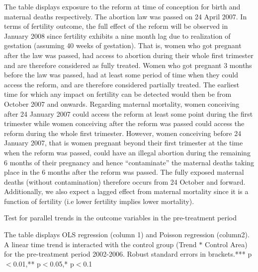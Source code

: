 \documentclass[a4paper, 11pt]{article}
\begin{document}
\begin{spacing}{1.4}
\begin{table}
\begin{threeparttable}
\begin{tablenotes}
  			The table displays exposure to the reform at time of conception for birth and maternal deaths respectively. The abortion law was passed on 24 April 2007. In terms of fertility outcome, the full effect of the reform will be observed in January 2008 since fertility exhibits a nine month lag due to realization of gestation (assuming 40 weeks of gestation). That is, women who got pregnant after the law was passed, had access to abortion during their whole first trimester and are therefore considered as fully treated. Women who got pregnant 3 months before the law was passed, had at least some period of time when they could access the reform, and are therefore considered partially treated. The earliest time for which any impact on fertility can be detected would then be from October 2007 and onwards. Regarding maternal mortality, women conceiving after 24 January 2007 could access the reform at least some point during the first trimester while women conceiving after the reform was passed could access the reform during the whole first trimester. However, women conceiving before 24 January 2007, that is women pregnant beyond their first trimester at the time when the reform was passed, could have an illegal abortion during the remaining 6 months of their pregnancy and hence ``contaminate'' the maternal deaths taking place in the 6 months after the reform was passed. The fully exposed maternal deaths (without contamination) therefore occurs from 24 October and forward. Additionally, we also expect a lagged effect from maternal mortality since it is a function of fertility (i.e lower fertility implies lower mortality).  
  			
  			           

  		\end{tablenotes}

  \end{threeparttable} 	

\end{table}  
 

\begin{table}[H]\caption{Test for parallel trends in the outcome variables in the pre-treatment period}\label{trendreg}  
	\begin{threeparttable}	
	
{\footnotesize 	\begin{tablenotes}
	\item The table displays OLS regression (column 1) and Poisson regression (column2). A linear time trend is interacted with the control group (Trend $*$ Control Area) for the pre-treatment period 2002-2006. Robust standard errors in brackets.*** p$<$0.01,** p$<$0.05,* p$<$0.1
\end{tablenotes}}
\end{threeparttable}
\end{table}


\end{spacing}
\end{document}
